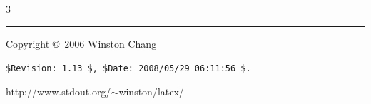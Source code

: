 \documentclass[10pt,landscape]{article}
\makeatletter
\renewcommand{\section}{\@startsection{section}{1}{0mm}%
                                {-1ex plus -.5ex minus -.2ex}%
                                {0.5ex plus .2ex}%
                                {\normalfont\large\bfseries}}
\renewcommand{\subsection}{\@startsection{subsection}{2}{0mm}%
                                {-1explus -.5ex minus -.2ex}%
                                {0.5ex plus .2ex}%
                                {\normalfont\normalsize\bfseries}}
\makeatother
\begin{document}
\begin{multicols}{3}
% 
% 
% 
% 
% 
% 
% 
% 



\rule{0.3\linewidth}{0.25pt}
\scriptsize

Copyright \copyright\ 2006 Winston Chang

\verb!$Revision: 1.13 $, $Date: 2008/05/29 06:11:56 $.!

http://www.stdout.org/$\sim$winston/latex/


\end{multicols}
\end{document}
